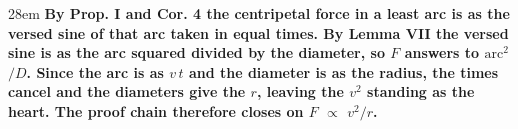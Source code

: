 \documentclass[border=4pt]{standalone}
\begin{document}
\begin{varwidth}{28em}
\large\bfseries
By Prop. I and Cor. 4 the \textcolor{force}{centripetal force} in a least arc is as the versed sine of that arc taken in equal times. By Lemma VII the versed sine is as the \textcolor{chord}{arc squared} divided by the diameter, so \textcolor{force}{$F$} answers to \textcolor{chord}{$\text{arc}^2$}$/D$. Since the arc is as $v\,t$ and the diameter is as the \textcolor{radius}{radius}, the times cancel and the diameters give the \textcolor{radius}{$r$}, leaving the \textcolor{chord}{$v^2$} standing as the heart. The proof chain therefore closes on \textcolor{force}{$F$} $\propto$ \textcolor{chord}{$v^2$}$/$\textcolor{radius}{$r$}.
\end{varwidth}
\end{document}
